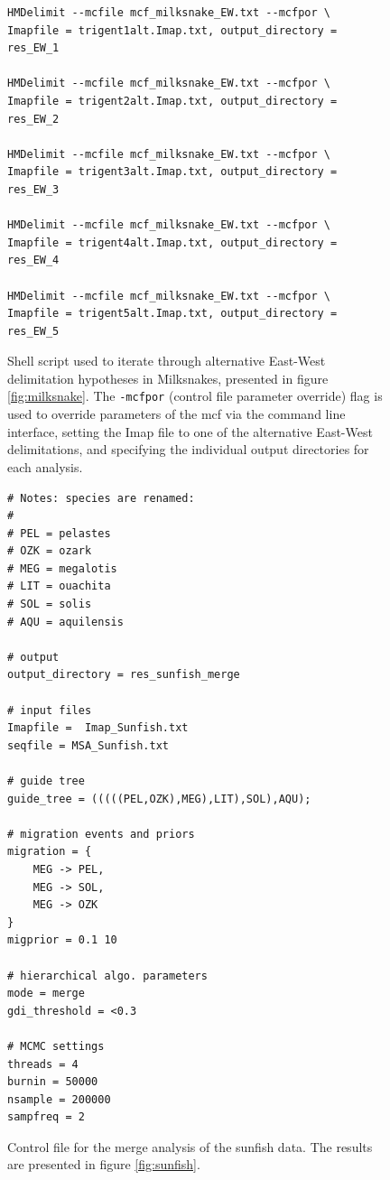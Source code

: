 \documentclass{article1}
\begin{document}
\begin{figure}[h]
\footnotesize
\begin{verbatim}
HMDelimit --mcfile mcf_milksnake_EW.txt --mcfpor \
Imapfile = trigent1alt.Imap.txt, output_directory = res_EW_1 

HMDelimit --mcfile mcf_milksnake_EW.txt --mcfpor \
Imapfile = trigent2alt.Imap.txt, output_directory = res_EW_2 

HMDelimit --mcfile mcf_milksnake_EW.txt --mcfpor \
Imapfile = trigent3alt.Imap.txt, output_directory = res_EW_3 

HMDelimit --mcfile mcf_milksnake_EW.txt --mcfpor \
Imapfile = trigent4alt.Imap.txt, output_directory = res_EW_4 

HMDelimit --mcfile mcf_milksnake_EW.txt --mcfpor \
Imapfile = trigent5alt.Imap.txt, output_directory = res_EW_5
\end{verbatim}

\caption{Shell script used to iterate through alternative East-West delimitation
hypotheses in Milksnakes, presented in figure \ref{fig:milksnake}. The \texttt{-mcfpor}
(control file parameter override) flag is used to override parameters of the mcf via the
command line interface, setting the Imap file to one of the alternative East-West
delimitations, and specifying the individual output directories for each analysis. %
} \label{fig:milksnake_EW_shell}
\end{figure}

\begin{figure}[h]
	\footnotesize
	\begin{verbatim}
# Notes: species are renamed:
#
# PEL = pelastes
# OZK = ozark
# MEG = megalotis
# LIT = ouachita
# SOL = solis
# AQU = aquilensis

# output
output_directory = res_sunfish_merge

# input files
Imapfile =  Imap_Sunfish.txt
seqfile = MSA_Sunfish.txt

# guide tree
guide_tree = (((((PEL,OZK),MEG),LIT),SOL),AQU);

# migration events and priors
migration = {
    MEG -> PEL,
    MEG -> SOL,
    MEG -> OZK
}
migprior = 0.1 10

# hierarchical algo. parameters
mode = merge
gdi_threshold = <0.3

# MCMC settings
threads = 4
burnin = 50000
nsample = 200000
sampfreq = 2
\end{verbatim}

\caption{Control file for the merge analysis of the sunfish data.  The results are
presented in figure \ref{fig:sunfish}. %
} \label{fig:sunfish_mcf_merge}
\end{figure}
\end{document}
